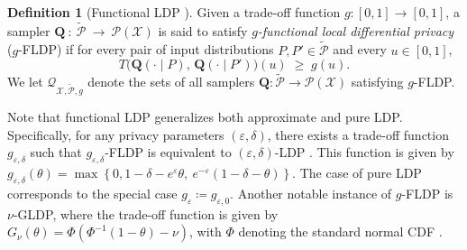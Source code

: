 \documentclass[accepted]{article}
\theoremstyle{plain} %
\theoremstyle{definition}
\newtheorem{definition}{Definition}[section]
\theoremstyle{remark}
\newcommand{\eps}{\varepsilon}
\newcommand{\HG}[1]{\textcolor{cyan}{[#1]}}
\begin{document}
\begin{definition}[Functional LDP \citep{dong2022gaussian,lee2023minimax}]\label{def:gFLDP}
Given a trade-off function $g:[0,1]\to[0,1]$,
a sampler 
\(\mathbf{Q}~:~\tilde{\mathcal{P}}~\to~\mathcal{P}(\mathcal{X})\)
is said to satisfy \emph{\(g\)-functional local differential privacy} (\(g\)-FLDP) if for every pair of input distributions \(P, P' \in \tilde{\mathcal{P}}\) and every
\(u \in [0,1]\),
\[
   T\bigl(\mathbf{Q}(\cdot\mid P),\,
            \mathbf{Q}(\cdot\mid P')\bigr)(u)
   \;\ge\; g(u).
\]
We let $\mathcal{Q}_{\mathcal{X}, \tilde{\mathcal{P}}, g}$ denote the sets of all samplers $\mathbf{Q} : \tilde{\mathcal{P}} \to \mathcal{P}(\mathcal{X})$ satisfying $g$-FLDP.
\end{definition}
Note that functional LDP generalizes both approximate and pure LDP. Specifically, for any privacy parameters \( (\varepsilon, \delta) \), there exists a trade-off function \( g_{\varepsilon,\delta} \) such that \( g_{\varepsilon,\delta} \)-FLDP is equivalent to \( (\varepsilon,\delta) \)-LDP \citep[Proposition 3]{dong2022gaussian}. This function is given by $g_{\varepsilon, \delta}(\theta) = \max \left\{ 0, 1 - \delta - e^{\varepsilon} \theta,\ e^{-\varepsilon}(1 - \delta - \theta) \right\}$. The case of pure LDP corresponds to the special case $g_{\eps} \coloneqq g_{\eps,0}$.
Another notable instance of \( g \)-FLDP is \( \nu \)-GLDP, where the trade-off function is given by
$G_\nu(\theta) = \Phi\left(\Phi^{-1}(1 - \theta) - \nu\right)$,
with \( \Phi \) denoting the standard normal CDF \citep{dong2022gaussian,lee2023minimax}.


\end{document}
